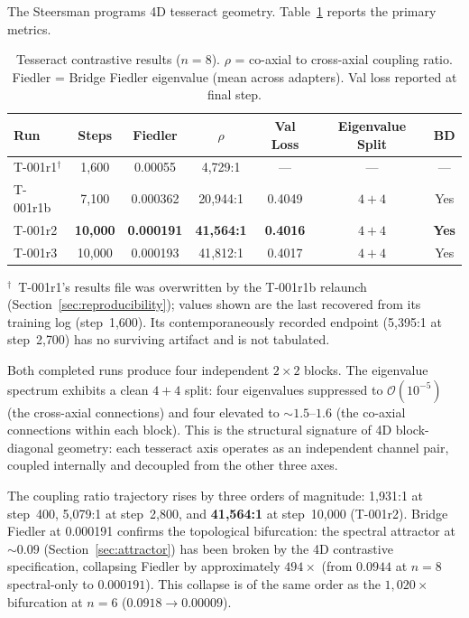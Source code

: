 The Steersman programs 4D tesseract geometry.
Table~\ref{tab:tesseract} reports the primary metrics.

\begin{table}[H]
\centering
\caption{Tesseract contrastive results ($n = 8$). $\rho$ = co-axial
  to cross-axial coupling ratio. Fiedler = Bridge Fiedler eigenvalue
  (mean across adapters). Val loss reported at final step.}
\label{tab:tesseract}
\small
\begin{tabular}{lcccccc}
\toprule
Run & Steps & Fiedler & $\rho$ & Val Loss & Eigenvalue Split & BD \\
\midrule
T-001r1$^{\dagger}$ & 1{,}600 & 0.00055 & 4{,}729:1 & --- & --- & --- \\
T-001r1b & 7{,}100 & 0.000362 & 20{,}944:1 & 0.4049 & $4{+}4$ & Yes \\
T-001r2 & \textbf{10{,}000} & \textbf{0.000191} & \textbf{41{,}564:1} & \textbf{0.4016} & $4{+}4$ & \textbf{Yes} \\
T-001r3 & 10{,}000 & 0.000193 & 41{,}812:1 & 0.4017 & $4{+}4$ & Yes \\
\bottomrule
\end{tabular}

\smallskip
\raggedright\footnotesize $^{\dagger}$~T-001r1's results file was
overwritten by the T-001r1b relaunch (Section~\ref{sec:reproducibility});
values shown are the last recovered from its training log (step~1{,}600).
Its contemporaneously recorded endpoint (5{,}395:1 at step~2{,}700) has
no surviving artifact and is not tabulated.
\end{table}

Both completed runs produce four independent $2 \times 2$ blocks. The
eigenvalue spectrum exhibits a clean $4{+}4$ split: four eigenvalues
suppressed to $\mathcal{O}(10^{-5})$ (the cross-axial connections)
and four elevated to ${\sim}1.5$--$1.6$ (the co-axial connections within
each block). This is the structural signature of 4D block-diagonal
geometry: each tesseract axis operates as an independent channel
pair, coupled internally and decoupled from the other three axes.

The coupling ratio trajectory rises by three orders of magnitude:
1{,}931:1 at step~400, 5{,}079:1 at step~2{,}800, and \textbf{41{,}564:1}
at step~10{,}000 (T-001r2). Bridge Fiedler at 0.000191 confirms the topological
bifurcation: the spectral attractor at ${\sim}0.09$
(Section~\ref{sec:attractor}) has been broken by the 4D contrastive
specification, collapsing Fiedler by approximately $494\times$
(from $0.0944$ at $n = 8$ spectral-only to $0.000191$). This
collapse is of the same order as the $1{,}020\times$ bifurcation
at $n = 6$ ($0.0918 \to 0.00009$).

